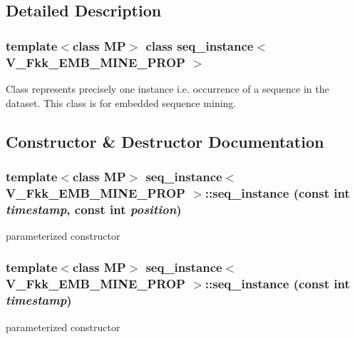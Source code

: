 \subsection{Detailed Description}
\subsubsection*{template$<$class MP$>$ class seq\_\-instance$<$ V\_\-Fkk\_\-EMB\_\-MINE\_\-PROP $>$}

Class represents precisely one instance i.e. occurrence of a sequence in the dataset. This class is for embedded sequence mining. 



\subsection{Constructor \& Destructor Documentation}
\subsubsection{\setlength{\rightskip}{0pt plus 5cm}template$<$class MP$>$ \bf{seq\_\-instance}$<$ V\_\-Fkk\_\-EMB\_\-MINE\_\-PROP $>$::\bf{seq\_\-instance} (const int {\em timestamp}, const int {\em position})\hspace{0.3cm}{\tt  [inline]}}\label{classseq__instance_3_01V__Fkk__EMB__MINE__PROP_01_4_2763230bcd22e4587b65dfa8cd5d5c32}


parameterized constructor 
\subsubsection{\setlength{\rightskip}{0pt plus 5cm}template$<$class MP$>$ \bf{seq\_\-instance}$<$ V\_\-Fkk\_\-EMB\_\-MINE\_\-PROP $>$::\bf{seq\_\-instance} (const int {\em timestamp})\hspace{0.3cm}{\tt  [inline]}}\label{classseq__instance_3_01V__Fkk__EMB__MINE__PROP_01_4_254250772b0c266b96710fa5dcee5ee6}


parameterized constructor 

